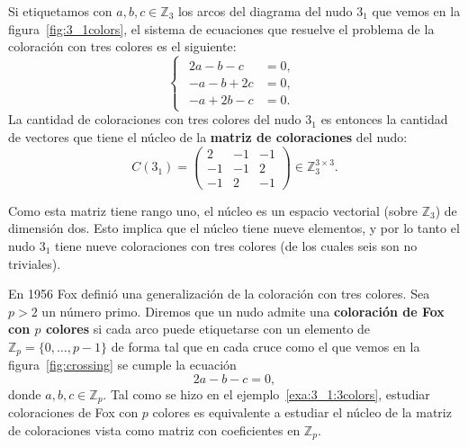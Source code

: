 \documentclass[graybox]{svmult}
\newcommand{\Z}{\mathbb{Z}}
\begin{document}
\begin{example}
	\label{exa:3_1:3colors}
	Si etiquetamos con $a,b,c\in\Z_3$ los arcos del diagrama del nudo $3_1$ que vemos 
	en la figura~\ref{fig:3_1colors}, el sistema
	de ecuaciones que resuelve el problema de la coloración con tres colores es el
	siguiente:
	\[
		\begin{cases}
			\begin{aligned}
				2a-b-c&=0,\\
				-a-b+2c&=0,\\
				-a+2b-c&=0.
			\end{aligned}
		\end{cases}
	\]
	La cantidad de coloraciones con tres colores del nudo $3_1$ es entonces la
	cantidad de vectores que tiene el núcleo de la \textbf{matriz de coloraciones}
	del nudo:
	\begin{equation*}
		C(3_1)=\begin{pmatrix}
			2 & -1 & -1\\
			-1 & -1 & 2\\
			-1 & 2 & -1
		\end{pmatrix}\in\Z_3^{3\times3}.
	\end{equation*}

    Como esta matriz tiene rango uno, el núcleo es un espacio vectorial (sobre
    $\Z_3$) de dimensión dos. Esto implica que el núcleo tiene nueve elementos,
    y por lo tanto el nudo $3_1$ tiene nueve coloraciones con tres colores (de los
    cuales seis son no triviales).
\end{example}

\label{block:fox}
En 1956 Fox definió una generalización de la coloración con tres colores.
Sea $p>2$ un número primo. Diremos que un nudo admite una \textbf{coloración de
Fox con $p$ colores} si cada arco puede etiquetarse con un elemento de 
$\Z_p=\{0,\dots,p-1\}$ de forma tal que en cada cruce como el que vemos
en la figura~\ref{fig:crossing} se cumple la ecuación
\[
	2a-b-c=0,
\]
donde $a,b,c\in\Z_p$.  Tal como se hizo en el
ejemplo~\ref{exa:3_1:3colors}, estudiar coloraciones de Fox con $p$ colores es
equivalente a estudiar el núcleo de la matriz de coloraciones vista como matriz
con coeficientes en $\Z_p$.
\end{document}
